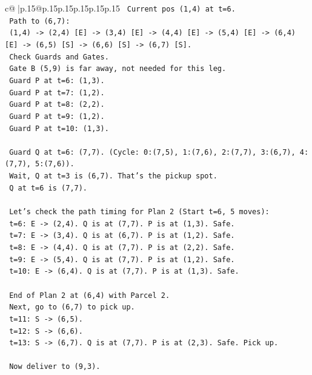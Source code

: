 \documentclass{article}
\begin{document}
{\begin{supertabular}{c@{$\;$}|p{.15\linewidth}@{}p{.15\linewidth}p{.15\linewidth}p{.15\linewidth}p{.15\linewidth}p{.15\linewidth}}
{{{\texttt{   Current pos (1,4) at t=6.} \\
\texttt{   Path to (6,7):} \\
\texttt{   (1,4) {-}> (2,4) {[}E{]} {-}> (3,4) {[}E{]} {-}> (4,4) {[}E{]} {-}> (5,4) {[}E{]} {-}> (6,4) {[}E{]} {-}> (6,5) {[}S{]} {-}> (6,6) {[}S{]} {-}> (6,7) {[}S{]}.} \\
\texttt{   Check Guards and Gates.} \\
\texttt{   Gate B (5,9) is far away, not needed for this leg.} \\
\texttt{   Guard P at t=6: (1,3).} \\
\texttt{   Guard P at t=7: (1,2).} \\
\texttt{   Guard P at t=8: (2,2).} \\
\texttt{   Guard P at t=9: (1,2).} \\
\texttt{   Guard P at t=10: (1,3).} \\
\\ 
\texttt{   Guard Q at t=6: (7,7). (Cycle: 0:(7,5), 1:(7,6), 2:(7,7), 3:(6,7), 4:(7,7), 5:(7,6)).} \\
\texttt{   Wait, Q at t=3 is (6,7). That's the pickup spot.} \\
\texttt{   Q at t=6 is (7,7).} \\
\\ 
\texttt{   Let's check the path timing for Plan 2 (Start t=6, 5 moves):} \\
\texttt{   t=6: E {-}> (2,4). Q is at (7,7). P is at (1,3). Safe.} \\
\texttt{   t=7: E {-}> (3,4). Q is at (6,7). P is at (1,2). Safe.} \\
\texttt{   t=8: E {-}> (4,4). Q is at (7,7). P is at (2,2). Safe.} \\
\texttt{   t=9: E {-}> (5,4). Q is at (7,7). P is at (1,2). Safe.} \\
\texttt{   t=10: E {-}> (6,4). Q is at (7,7). P is at (1,3). Safe.} \\
\\ 
\texttt{   End of Plan 2 at (6,4) with Parcel 2.} \\
\texttt{   Next, go to (6,7) to pick up.} \\
\texttt{   t=11: S {-}> (6,5).} \\
\texttt{   t=12: S {-}> (6,6).} \\
\texttt{   t=13: S {-}> (6,7). Q is at (7,7). P is at (2,3). Safe. Pick up.} \\
\\ 
\texttt{   Now deliver to (9,3).} \\
}}}
\end{supertabular}}
\end{document}
